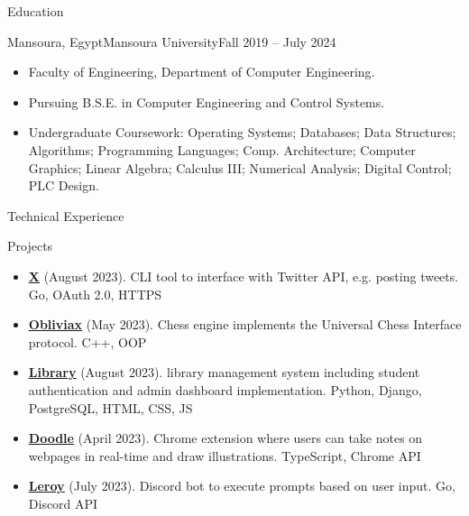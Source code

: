 \documentclass[]{cv}
\begin{document}
	\begin{cvsection}{Education}
	
	\vspace{3mm}

		\begin{cvsubsection}{Mansoura, Egypt}{Mansoura University}{Fall 2019 -- July 2024}
			\begin{itemize}
				\item Faculty of Engineering, Department of Computer Engineering.
				\item Pursuing B.S.E. in Computer Engineering and Control Systems.
				
				\item Undergraduate Coursework: Operating Systems; Databases; Data Structures; Algorithms; Programming Languages; Comp. Architecture; Computer Graphics; Linear Algebra; Calculus III; Numerical Analysis; Digital Control; PLC Design.
			\end{itemize}
		\end{cvsubsection}
	\end{cvsection}
	
	\begin{cvsection}{Technical Experience}
	\vspace{3mm}

		\begin{cvsubsection}{Projects}{}{}
			\begin{itemize}
				\item \textbf{{\color{blue}\underline{\href{https://github.com/devhindo/x}{X}}}} (August 2023). CLI tool to interface with Twitter API, e.g. posting tweets.  Go, OAuth 2.0, HTTPS
				\item \textbf{{\color{blue}\underline{\href{https://github.com/devhindo/obliviax}{Obliviax}}}} (May 2023). Chess engine implements the Universal Chess Interface protocol.  C++, OOP
				
				
				\item \textbf{{\color{blue}\underline{\href{https://github.com/lilhind/iti23/tree/main/library}{Library}}}} (August 2023). library management system including student authentication and admin dashboard implementation.  Python, Django, PostgreSQL, HTML, CSS, JS

				\item \textbf{{\color{blue}\underline{\href{https://github.com/devhindo/doodle}{Doodle}}}} (April 2023). Chrome extension where users can take notes on webpages in real-time and draw illustrations. TypeScript, Chrome API				
				
				\item \textbf{{\color{blue}\underline{\href{https://github.com/devhindo/leroy}{Leroy}}}} (July 2023). Discord bot to execute prompts based on user input.  Go, Discord API
			\end{itemize}
		\end{cvsubsection}
	\end{cvsection}
	
\end{document}
